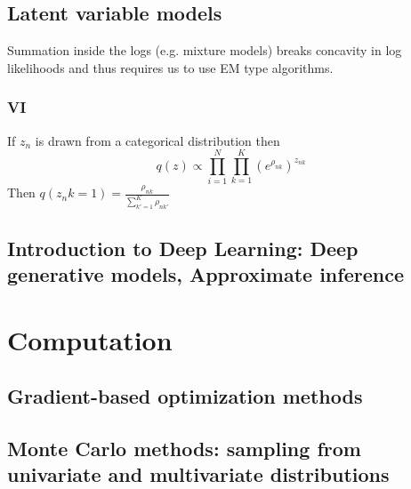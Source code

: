 \documentclass{article}
\begin{document}
\subsection{Latent variable models}
Summation inside the logs (e.g. mixture models) breaks concavity in log likelihoods and thus requires us to use EM type algorithms.\\
\subsubsection{VI}
If $z_n$ is drawn from a categorical distribution then
\[ q(z) \propto \prod_{i=1}^{N}\prod_{k=1}^{K} (e^{\rho_{nk}})^{z_{nk}}\]
Then $q(z_nk = 1) = \frac{\rho_{nk}}{\sum_{k'=1}^{K}\rho_{nk'}}$
\subsection{Introduction to Deep Learning: Deep generative models, Approximate inference}

\section{Computation}
\subsection{Gradient-based optimization methods}
\subsection{Monte Carlo methods: sampling from univariate and multivariate distributions}

\end{document}
